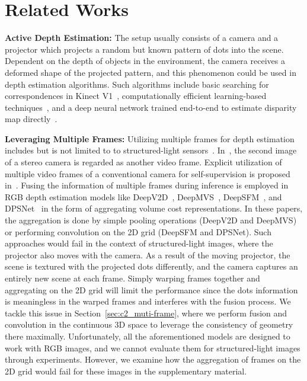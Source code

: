 \section{Related Works} \label{sec:c2_related_work}

\noindent\textbf{Active Depth Estimation:} The setup usually consists of a camera and a projector which projects a random but known pattern of dots into the scene. Dependent on the depth of objects in the environment, the camera receives a deformed shape of the projected pattern, and this phenomenon could be used in depth estimation algorithms. Such algorithms include basic searching for correspondences in Kinect V1~\cite{martinez2013kinect}, computationally efficient learning-based techniques~\cite{fanello2017ultrastereo, ryan2016hyperdepth, chen2014fast}, and a deep neural network trained end-to-end to estimate disparity map directly~\cite{zhang2018activestereonet, kleitsiotis2019color, riegler2019connecting}.

\bigbreak\noindent\textbf{Leveraging Multiple Frames:} Utilizing multiple frames for depth estimation includes but is not limited to to structured-light sensors~\cite{riegler2019connecting}. In~\cite{godard2017unsupervised, xie2016deep3d, kuznietsov2017semi}, the second image of a stereo camera is regarded as another video frame. Explicit utilization of multiple video frames of a conventional camera for self-supervision is proposed in~\cite{zhan2018unsupervised, zhou2017unsupervised, bian2019unsupervised, godard2019digging, guizilini20203d, pillai2019superdepth, casser2019unsupervised}. Fusing the information of multiple frames during inference is employed in RGB depth estimation models like 
DeepV2D~\cite{teed2019deepv2d}, DeepMVS~\cite{huang2018deepmvs}, DeepSFM~\cite{wei2020deepsfm}, and DPSNet~\cite{im2018dpsnet} in the form of aggregating volume cost representations. In these papers, the aggregation is done by simple pooling operations (DeepV2D and DeepMVS) or performing convolution on the 2D grid (DeepSFM and DPSNet). Such approaches would fail in the context of structured-light images, where the projector also moves with the camera. As a result of the moving projector, the scene is textured with the projected dots differently, and the camera captures an entirely new scene at each frame. Simply warping frames together and aggregating on the 2D grid will limit the performance since the dots information is meaningless in the warped frames and interferes with the fusion process. We tackle this issue in Section~\ref{sec:c2_muti-frame}, where we perform fusion and convolution in the continuous 3D space to leverage the consistency of geometry there maximally. Unfortunately, all the aforementioned models are designed to work with RGB images, and we cannot evaluate them for structured-light images through experiments. However, we examine how the aggregation of frames on the 2D grid would fail for these images in the supplementary material.

